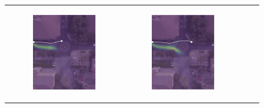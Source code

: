 \documentclass[conference]{IEEEtran}
\begin{document}
\begin{figure}
\begin{tabular}{M{.1\linewidth}  M{.3\linewidth} M{.3\linewidth}  M{.3\linewidth}}
\begin{subfigure}[b]{\linewidth}
		\includegraphics[width=\linewidth]{./figures/comparison/kit_death_1_2_t=250.png}
	\end{subfigure} &
	\begin{subfigure}[b]{\linewidth}
		\includegraphics[width=\linewidth]{./figures/comparison/kit_death_1_2_t=370.png}

\end{subfigure}
\end{tabular}
\end{figure}
\end{document}
